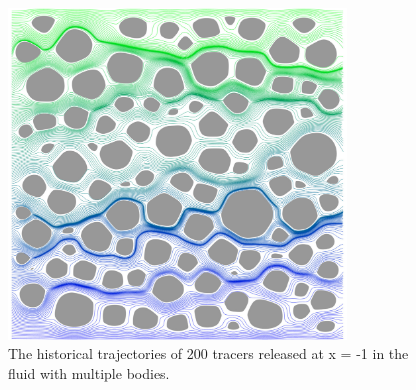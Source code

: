 \documentclass[preprint, 10pt]{elsarticle}
\begin{document}
\begin{figure}[H]
\begin{center}
\includegraphics[width = 0.8\textwidth]{./figs/100b_t100tracer}
\caption{\label{fig:Eroding100tracer} The historical trajectories of 
200 tracers released at x = -1 in the fluid with multiple bodies.}
\end{center}
\end{figure}
\end{document}
